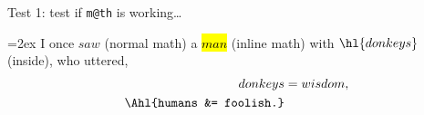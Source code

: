 \documentclass{article}
\begin{document}
Test 1: test if \verb|m@th| is working\ldots

\mathsurround=2ex
I once $saw$ (normal math) a \hl{$man$} (inline math) with $\hl{donkeys}$
(inside), who uttered,
\begin{align*}
  donkeys &= wisdom, \\
  \Ahl{humans &= foolish.}
\end{align*}
\end{document}
